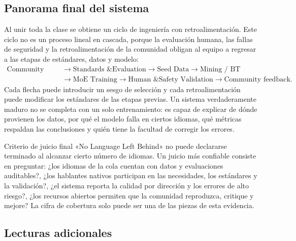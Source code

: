 \subsection{Panorama final del sistema}

Al unir toda la clase se obtiene un ciclo de ingeniería con retroalimentación. Este ciclo no es un proceso lineal en cascada, porque la evaluación humana, las fallas de seguridad y la retroalimentación de la comunidad obligan al equipo a regresar a las etapas de estándares, datos y modelo:
\[
\begin{aligned}
\text{Community needs}
&\rightarrow\text{Standards \& Evaluation}
\rightarrow\text{Seed Data}
\rightarrow\text{Mining / BT}\\
&\rightarrow\text{MoE Training}
\rightarrow\text{Human \& Safety Validation}
\rightarrow\text{Community feedback}.
\end{aligned}
\]
Cada flecha puede introducir un sesgo de selección y cada retroalimentación puede modificar los estándares de las etapas previas. Un sistema verdaderamente maduro no se completa con un solo entrenamiento: es capaz de explicar de dónde provienen los datos, por qué el modelo falla en ciertos idiomas, qué métricas respaldan las conclusiones y quién tiene la facultad de corregir los errores.

\begin{importantbox}{Criterio de juicio final}
«No Language Left Behind» no puede declararse terminado al alcanzar cierto número de idiomas. Un juicio más confiable consiste en preguntar: ¿los idiomas de la cola cuentan con datos y evaluaciones auditables?, ¿los hablantes nativos participan en las necesidades, los estándares y la validación?, ¿el sistema reporta la calidad por dirección y los errores de alto riesgo?, ¿los recursos abiertos permiten que la comunidad reproduzca, critique y mejore? La cifra de cobertura solo puede ser una de las piezas de esta evidencia.
\end{importantbox}

\subsection{Lecturas adicionales}

